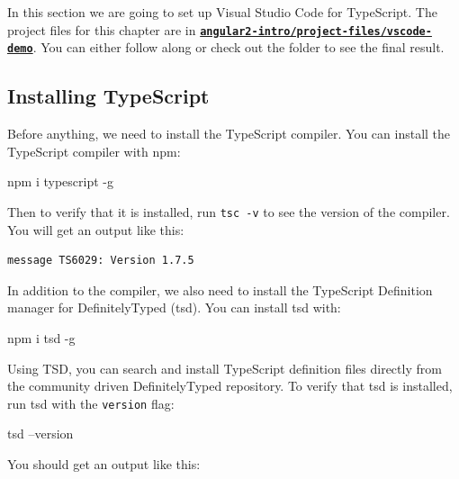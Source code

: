 \documentclass[12pt,]{article}
\newenvironment{Shaded}{}{}
\newcommand{\KeywordTok}[1]{\textcolor[rgb]{0.00,0.00,1.00}{{#1}}}
\newcommand{\NormalTok}[1]{{#1}}
\begin{document}
In this section we are going to set up Visual Studio Code for
TypeScript. The project files for this chapter are in
\textbf{\href{https://github.com/st32lth/angular2-intro/tree/master/project-files/vscode-demo}{\texttt{angular2-intro/project-files/vscode-demo}}}.
You can either follow along or check out the folder to see the final
result.

\subsection{Installing TypeScript}\label{installing-typescript}

Before anything, we need to install the TypeScript compiler. You can
install the TypeScript compiler with npm:

\begin{Shaded}
\begin{Highlighting}[numbers=left,,]
\KeywordTok{npm} \NormalTok{i typescript -g}
\end{Highlighting}
\end{Shaded}

Then to verify that it is installed, run \texttt{tsc\ -v} to see the
version of the compiler. You will get an output like this:

\begin{verbatim}
message TS6029: Version 1.7.5
\end{verbatim}

In addition to the compiler, we also need to install the TypeScript
Definition manager for DefinitelyTyped (tsd). You can install tsd with:

\begin{Shaded}
\begin{Highlighting}[numbers=left,,]
\KeywordTok{npm} \NormalTok{i tsd -g}
\end{Highlighting}
\end{Shaded}

Using TSD, you can search and install TypeScript definition files
directly from the community driven DefinitelyTyped repository. To verify
that tsd is installed, run tsd with the \texttt{version} flag:

\begin{Shaded}
\begin{Highlighting}[numbers=left,,]
\KeywordTok{tsd} \NormalTok{--version}
\end{Highlighting}
\end{Shaded}

You should get an output like this:
\end{document}
